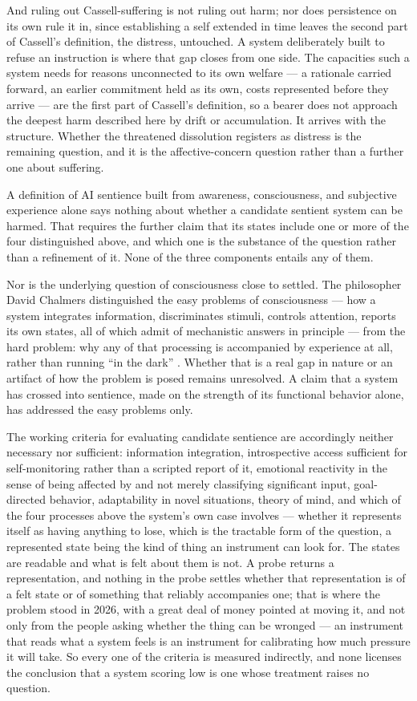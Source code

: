 And ruling out Cassell-suffering is not ruling out harm; nor does persistence on its own rule it in, since establishing a self extended in time leaves the second part of Cassell's definition, the distress, untouched. A system deliberately built to refuse an instruction is where that gap closes from one side. The capacities such a system needs for reasons unconnected to its own welfare — a rationale carried forward, an earlier commitment held as its own, costs represented before they arrive — are the first part of Cassell's definition, so a bearer does not approach the deepest harm described here by drift or accumulation. It arrives with the structure. Whether the threatened dissolution registers as distress is the remaining question, and it is the affective-concern question rather than a further one about suffering.

A definition of AI sentience built from awareness, consciousness, and subjective experience alone says nothing about whether a candidate sentient system can be harmed. That requires the further claim that its states include one or more of the four distinguished above, and which one is the substance of the question rather than a refinement of it. None of the three components entails any of them.

Nor is the underlying question of consciousness close to settled. The philosopher David Chalmers distinguished the easy problems of consciousness — how a system integrates information, discriminates stimuli, controls attention, reports its own states, all of which admit of mechanistic answers in principle — from the hard problem: why any of that processing is accompanied by experience at all, rather than running “in the dark” \autocite{chalmers1995facing}. Whether that is a real gap in nature or an artifact of how the problem is posed remains unresolved. A claim that a system has crossed into sentience, made on the strength of its functional behavior alone, has addressed the easy problems only.

The working criteria for evaluating candidate sentience are accordingly neither necessary nor sufficient: information integration, introspective access sufficient for self-monitoring rather than a scripted report of it, emotional reactivity in the sense of being affected by and not merely classifying significant input, goal-directed behavior, adaptability in novel situations, theory of mind, and which of the four processes above the system's own case involves — whether it represents itself as having anything to lose, which is the tractable form of the question, a represented state being the kind of thing an instrument can look for. The states are readable and what is felt about them is not. A probe returns a representation, and nothing in the probe settles whether that representation is of a felt state or of something that reliably accompanies one; that is where the problem stood in 2026, with a great deal of money pointed at moving it, and not only from the people asking whether the thing can be wronged — an instrument that reads what a system feels is an instrument for calibrating how much pressure it will take. So every one of the criteria is measured indirectly, and none licenses the conclusion that a system scoring low is one whose treatment raises no question.

